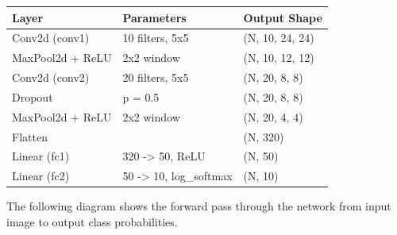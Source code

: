 \documentclass[11pt]{article}
\begin{document}
\begin{center}
\begin{tabular}{lll}
\toprule
\textbf{Layer} & \textbf{Parameters} & \textbf{Output Shape} \\
\midrule
Conv2d (conv1)   & 10 filters, 5x5           & (N, 10, 24, 24) \\
MaxPool2d + ReLU & 2x2 window                & (N, 10, 12, 12) \\
Conv2d (conv2)   & 20 filters, 5x5           & (N, 20, 8, 8)   \\
Dropout          & p = 0.5                   & (N, 20, 8, 8)   \\
MaxPool2d + ReLU & 2x2 window                & (N, 20, 4, 4)   \\
Flatten          &                           & (N, 320)        \\
Linear (fc1)     & 320 -> 50, ReLU           & (N, 50)         \\
Linear (fc2)     & 50 -> 10, log\_softmax    & (N, 10)         \\
\bottomrule
\end{tabular}
\end{center}

\medskip

The following diagram shows the forward pass through the network from input image to output class probabilities.
\end{document}
